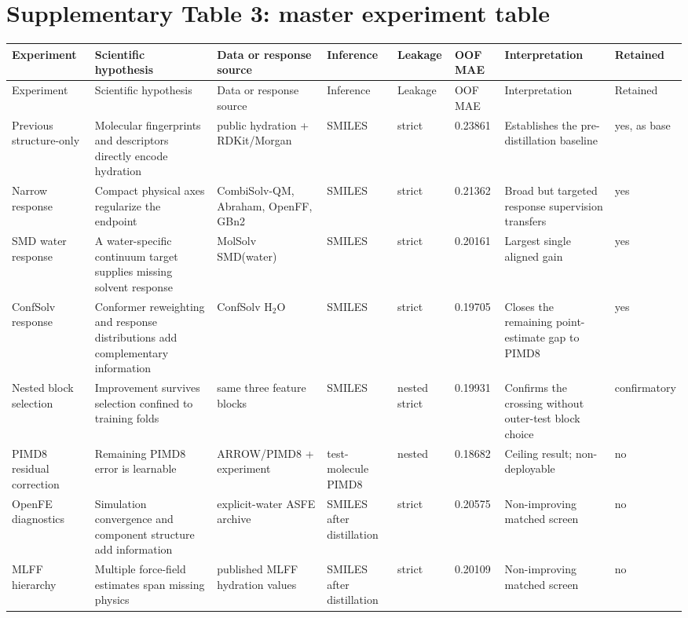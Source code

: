 \documentclass[10pt]{article}
\begin{document}
\section*{Supplementary Table 3: master experiment table}

\begin{landscape}
\footnotesize
\setlength{\tabcolsep}{3pt}
\begin{longtable}{p{2.8cm}p{4.0cm}p{3.1cm}p{2.4cm}p{1.8cm}p{1.5cm}p{4.3cm}p{1.6cm}}
\toprule
Experiment & Scientific hypothesis & Data or response source & Inference & Leakage & OOF MAE & Interpretation & Retained \\
\midrule
\endfirsthead
\toprule
Experiment & Scientific hypothesis & Data or response source & Inference & Leakage & OOF MAE & Interpretation & Retained \\
\midrule
\endhead
Previous structure-only & Molecular fingerprints and descriptors directly encode hydration & public hydration + RDKit/Morgan & SMILES & strict & 0.23861 & Establishes the pre-distillation baseline & yes, as base \\
Narrow response & Compact physical axes regularize the endpoint & CombiSolv-QM, Abraham, OpenFF, GBn2 & SMILES & strict & 0.21362 & Broad but targeted response supervision transfers & yes \\
SMD water response & A water-specific continuum target supplies missing solvent response & MolSolv SMD(water) & SMILES & strict & 0.20161 & Largest single aligned gain & yes \\
ConfSolv response & Conformer reweighting and response distributions add complementary information & ConfSolv H$_2$O & SMILES & strict & 0.19705 & Closes the remaining point-estimate gap to PIMD8 & yes \\
Nested block selection & Improvement survives selection confined to training folds & same three feature blocks & SMILES & nested strict & 0.19931 & Confirms the crossing without outer-test block choice & confir\-matory \\
PIMD8 residual correction & Remaining PIMD8 error is learnable & ARROW/PIMD8 + experiment & test-molecule PIMD8 & nested & 0.18682 & Ceiling result; non-deployable & no \\
OpenFE diagnostics & Simulation convergence and component structure add information & explicit-water ASFE archive & SMILES after distillation & strict & 0.20575 & Non-improving matched screen & no \\
MLFF hierarchy & Multiple force-field estimates span missing physics & published MLFF hydration values & SMILES after distillation & strict & 0.20109 & Non-improving matched screen & no \\

\end{longtable}
\end{landscape}
\end{document}
